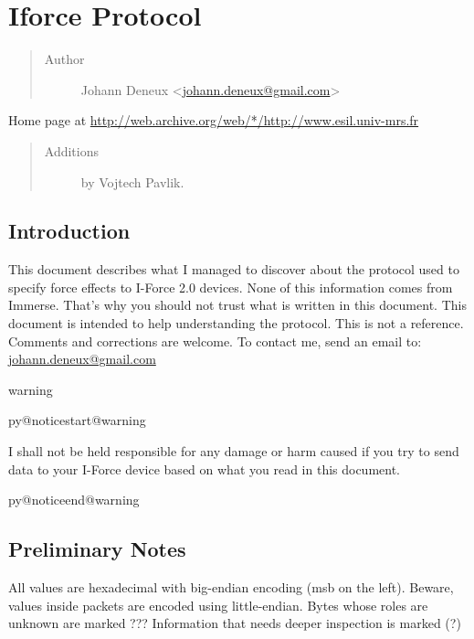 \documentclass[a4paper,8pt,english]{sphinxmanual}
\makeatletter
\renewenvironment{notice}[2]{%
          \def\py@noticetype{#1}
          \begin{coloredbox}{#1}
          \bf\it
          \par\strong{#2}
          \csname py@noticestart@#1\endcsname
        }
	{
          \csname py@noticeend@\py@noticetype\endcsname
          \end{coloredbox}
        }
\makeatother
\begin{document}
\section{Iforce Protocol}
\label{input/devices/iforce-protocol:iforce-protocol}\label{input/devices/iforce-protocol::doc}\begin{quote}\begin{description}
\item[{Author}] \leavevmode
Johann Deneux \textless{}\href{mailto:johann.deneux@gmail.com}{johann.deneux@gmail.com}\textgreater{}

\end{description}\end{quote}

Home page at \href{http://web.archive.org/web/*/http://www.esil.univ-mrs.fr}{http://web.archive.org/web/*/http://www.esil.univ-mrs.fr}
\begin{quote}\begin{description}
\item[{Additions}] \leavevmode
by Vojtech Pavlik.

\end{description}\end{quote}


\subsection{Introduction}
\label{input/devices/iforce-protocol:introduction}
This document describes what I managed to discover about the protocol used to
specify force effects to I-Force 2.0 devices.  None of this information comes
from Immerse. That's why you should not trust what is written in this
document. This document is intended to help understanding the protocol.
This is not a reference. Comments and corrections are welcome.  To contact me,
send an email to: \href{mailto:johann.deneux@gmail.com}{johann.deneux@gmail.com}

\begin{notice}{warning}{Warning:}
I shall not be held responsible for any damage or harm caused if you try to
send data to your I-Force device based on what you read in this document.
\end{notice}


\subsection{Preliminary Notes}
\label{input/devices/iforce-protocol:preliminary-notes}
All values are hexadecimal with big-endian encoding (msb on the left). Beware,
values inside packets are encoded using little-endian.  Bytes whose roles are
unknown are marked ???  Information that needs deeper inspection is marked (?)
\end{document}
